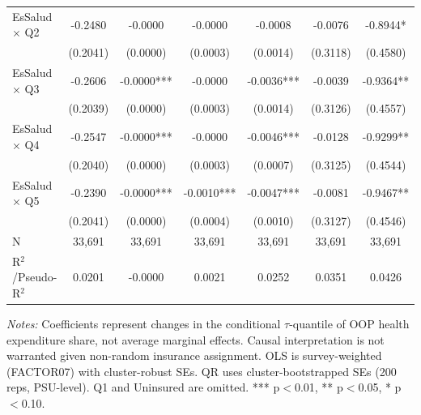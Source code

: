 \begin{table}[htbp]
\begin{tabular}{lcccccc}
  EsSalud $\times$ Q2 & -0.2480 & -0.0000 & -0.0000 & -0.0008 & -0.0076 & -0.8944* \\
  & (0.2041) & (0.0000) & (0.0003) & (0.0014) & (0.3118) & (0.4580) \\
  EsSalud $\times$ Q3 & -0.2606 & -0.0000*** & -0.0000 & -0.0036*** & -0.0039 & -0.9364** \\
  & (0.2039) & (0.0000) & (0.0003) & (0.0014) & (0.3126) & (0.4557) \\
  EsSalud $\times$ Q4 & -0.2547 & -0.0000*** & -0.0000 & -0.0046*** & -0.0128 & -0.9299** \\
  & (0.2040) & (0.0000) & (0.0003) & (0.0007) & (0.3125) & (0.4544) \\
  EsSalud $\times$ Q5 & -0.2390 & -0.0000*** & -0.0010*** & -0.0047*** & -0.0081 & -0.9467** \\
  & (0.2041) & (0.0000) & (0.0004) & (0.0010) & (0.3127) & (0.4546) \\
\midrule
  N & 33,691 & 33,691 & 33,691 & 33,691 & 33,691 & 33,691 \\
  R$^2$/Pseudo-R$^2$ & 0.0201 & -0.0000 & 0.0021 & 0.0252 & 0.0351 & 0.0426 \\
\bottomrule
\end{tabular}
\begin{minipage}{\textwidth}\footnotesize
\textit{Notes:} Coefficients represent changes in the conditional $\tau$-quantile of OOP
health expenditure share, not average marginal effects. Causal interpretation is not warranted
given non-random insurance assignment. OLS is survey-weighted (FACTOR07) with cluster-robust SEs.
QR uses cluster-bootstrapped SEs (200 reps, PSU-level). Q1 and Uninsured are omitted.
*** p$<$0.01, ** p$<$0.05, * p$<$0.10.
\end{minipage}
\end{table}